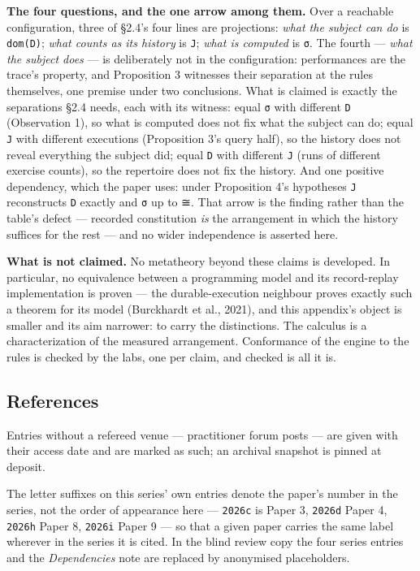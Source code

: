 \documentclass[
]{article}
\begin{document}
\textbf{The four questions, and the one arrow among them.} Over a
reachable configuration, three of §2.4's four lines are projections:
\emph{what the subject can do} is \texttt{dom(D)}; \emph{what counts as
its history} is \texttt{J}; \emph{what is computed} is \texttt{σ}. The
fourth --- \emph{what the subject does} --- is deliberately not in the
configuration: performances are the trace's property, and Proposition 3
witnesses their separation at the rules themselves, one premise under
two conclusions. What is claimed is exactly the separations §2.4 needs,
each with its witness: equal \texttt{σ} with different \texttt{D}
(Observation 1), so what is computed does not fix what the subject can
do; equal \texttt{J} with different executions (Proposition 3's query
half), so the history does not reveal everything the subject did; equal
\texttt{D} with different \texttt{J} (runs of different exercise
counts), so the repertoire does not fix the history. And one positive
dependency, which the paper uses: under Proposition 4's hypotheses
\texttt{J} reconstructs \texttt{D} exactly and \texttt{σ} up to ≅. That
arrow is the finding rather than the table's defect --- recorded
constitution \emph{is} the arrangement in which the history suffices for
the rest --- and no wider independence is asserted here.

\textbf{What is not claimed.} No metatheory beyond these claims is
developed. In particular, no equivalence between a programming model and
its record-replay implementation is proven --- the durable-execution
neighbour proves exactly such a theorem for its model (Burckhardt et
al., 2021), and this appendix's object is smaller and its aim narrower:
to carry the distinctions. The calculus is a characterization of the
measured arrangement. Conformance of the engine to the rules is checked
by the labs, one per claim, and checked is all it is.

\subsection{References}\label{references}

Entries without a refereed venue --- practitioner forum posts --- are
given with their access date and are marked as such; an archival
snapshot is pinned at deposit.

The letter suffixes on this series' own entries denote the paper's
number in the series, not the order of appearance here ---
\texttt{2026c} is Paper 3, \texttt{2026d} Paper 4, \texttt{2026h} Paper
8, \texttt{2026i} Paper 9 --- so that a given paper carries the same
label wherever in the series it is cited. In the blind review copy the
four series entries and the \emph{Dependencies} note are replaced by
anonymised placeholders.
\end{document}

